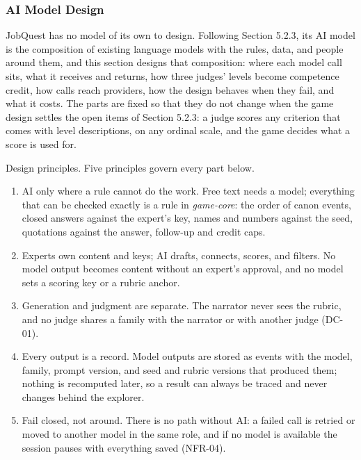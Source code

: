 \setcounter{subsubsection}{5}

\subsubsection{AI Model Design}

JobQuest has no model of its own to design. Following Section 5.2.3, its AI model is the composition of existing language models with the rules, data, and people around them, and this section designs that composition: where each model call sits, what it receives and returns, how three judges' levels become competence credit, how calls reach providers, how the design behaves when they fail, and what it costs. The parts are fixed so that they do not change when the game design settles the open items of Section 5.2.3: a judge scores any criterion that comes with level descriptions, on any ordinal scale, and the game decides what a score is used for.

Design principles. Five principles govern every part below.

\begin{enumerate}[leftmargin=1.5em]
  \item AI only where a rule cannot do the work. Free text needs a model; everything that can be checked exactly is a rule in \textit{game-core}: the order of canon events, closed answers against the expert's key, names and numbers against the seed, quotations against the answer, follow-up and credit caps.
  \item Experts own content and keys; AI drafts, connects, scores, and filters. No model output becomes content without an expert's approval, and no model sets a scoring key or a rubric anchor.
  \item Generation and judgment are separate. The narrator never sees the rubric, and no judge shares a family with the narrator or with another judge (DC-01).
  \item Every output is a record. Model outputs are stored as events with the model, family, prompt version, and seed and rubric versions that produced them; nothing is recomputed later, so a result can always be traced and never changes behind the explorer.
  \item Fail closed, not around. There is no path without AI: a failed call is retried or moved to another model in the same role, and if no model is available the session pauses with everything saved (NFR-04).
\end{enumerate}

